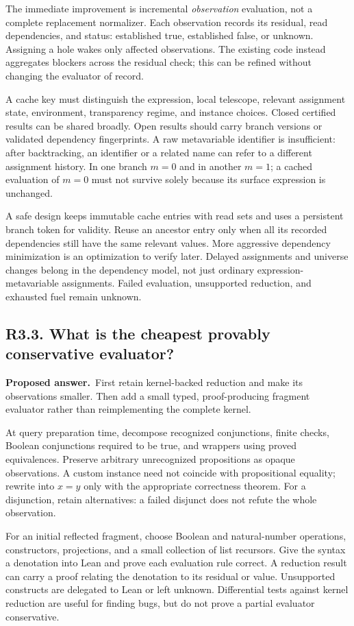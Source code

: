 \documentclass[11pt,a4paper]{article}
\newcommand{\code}[1]{\texttt{\small\detokenize{#1}}}
\newcommand{\question}[2]{\subsection{#1. #2}\label{q:#1}}
\newcommand{\answer}{\textbf{Proposed answer.}\ }
\theoremstyle{remark}
\begin{document}
The immediate improvement is incremental \emph{observation} evaluation, not
a complete replacement normalizer. Each observation records its residual,
read dependencies, and status: established true, established false, or
unknown. Assigning a hole wakes only affected observations. The existing
code instead aggregates blockers across the residual check; this can be
refined without changing the evaluator of record.\cite{leantcore}

A cache key must distinguish the expression, local telescope, relevant
assignment state, environment, transparency regime, and instance choices.
Closed certified results can be shared broadly. Open results should carry
branch versions or validated dependency fingerprints. A raw metavariable
identifier is insufficient: after backtracking, an identifier or a related
name can refer to a different assignment history. In one branch $m=0$ and in
another $m=1$; a cached evaluation of $m=0$ must not survive solely because
its surface expression is unchanged.

A safe design keeps immutable cache entries with read sets and uses a
persistent branch token for validity. Reuse an ancestor entry only when all
its recorded dependencies still have the same relevant values. More
aggressive dependency minimization is an optimization to verify later.
Delayed assignments and universe changes belong in the dependency model,
not just ordinary expression-metavariable assignments. Failed evaluation,
unsupported reduction, and exhausted fuel remain unknown.

\question{R3.3}{What is the cheapest provably conservative evaluator?}

\answer First retain kernel-backed reduction and make its observations
smaller. Then add a small typed, proof-producing fragment evaluator rather
than reimplementing the complete kernel.

At query preparation time, decompose recognized conjunctions, finite
\code{List.all} checks, Boolean conjunctions required to be true, and
\code{decide} wrappers using proved equivalences. Preserve arbitrary
unrecognized propositions as opaque observations. A custom \code{BEq}
instance need not coincide with propositional equality; rewrite \code{x == y}
into $x=y$ only with the appropriate correctness theorem. For a disjunction,
retain alternatives: a failed disjunct does not refute the whole observation.

For an initial reflected fragment, choose Boolean and natural-number
operations, constructors, projections, and a small collection of list
recursors. Give the syntax a denotation into Lean and prove each evaluation
rule correct. A reduction result can carry a proof relating the denotation
to its residual or value. Unsupported constructs are delegated to Lean or
left unknown. Differential tests against kernel reduction are useful for
finding bugs, but do not prove a partial evaluator conservative.
\end{document}
